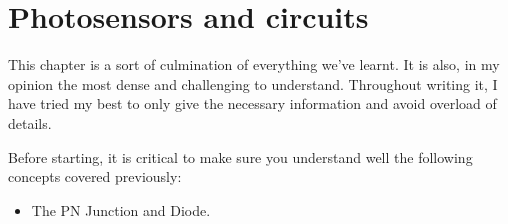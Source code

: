 \newpage
\section{Photosensors and circuits}

This chapter is a sort of culmination of everything we've learnt. It is also, in my opinion the most dense and challenging to understand. Throughout writing it, I have tried my best to only give the necessary information and avoid overload of details.

Before starting, it is critical to make sure you understand well the following concepts covered previously: 
\begin{itemize}
    \item The PN Junction and Diode. 
\end{itemize}














